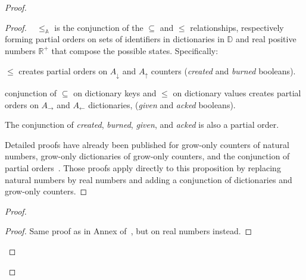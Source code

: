 \documentclass[9pt, oneside]{article}   	%
\begin{document}
	
\begin{proof}
	\begin{proof}
		\pfsketch~ $\leq_\mathds{A}$ is the conjunction of the $\subseteq$ and $\leq$ relationships, respectively forming partial orders on sets of identifiers in dictionaries in $\mathds{D}$ and real positive numbers $\mathds{R}^+$ that compose the possible states. Specifically:
		\begin{pfenum}
			\item $\leq$ creates partial orders on $A_\downarrow$ and $A_\uparrow$ counters (\textit{created} and \textit{burned} booleans).
			\item conjunction of $\subseteq$ on dictionary keys and $\leq$ on dictionary values creates partial orders on $A_\rightarrow$ and $A_\leftarrow$ dictionaries, (\textit{given} and \textit{acked} booleans).
			\item The conjunction of \textit{created}, \textit{burned}, \textit{given}, and \textit{acked} is also a partial order.
		\end{pfenum} 		
		Detailed proofs have already been published for grow-only counters of natural numbers, grow-only dictionaries of grow-only counters, and the conjunction of partial orders~\cite{lavoie2023statebased}. Those proofs apply directly to this proposition by replacing natural numbers by real numbers and adding a conjunction of dictionaries and grow-only counters.
	\end{proof}


		\begin{proof}
			\begin{proof}
				Same proof as in Annex of~\cite{lavoie2023statebased}, but on real numbers instead.
			\end{proof}
			

\end{proof}
\end{proof}
\end{document}

